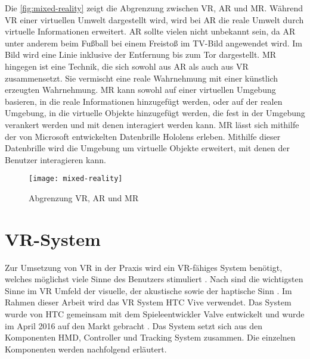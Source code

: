 Die \autoref{fig:mixed-reality} zeigt die Abgrenzung zwischen \ac{VR}, \ac{AR} und \ac{MR}. Während \ac{VR} einer virtuellen Umwelt dargestellt wird, wird bei \ac{AR} die reale Umwelt durch virtuelle Informationen erweitert. \ac{AR} sollte vielen nicht unbekannt sein, da \ac{AR} unter anderem beim Fußball bei einem Freistoß im TV-Bild angewendet wird. Im Bild wird eine Linie inklusive der Entfernung bis zum Tor dargestellt. \ac{MR} hingegen ist eine Technik, die sich sowohl aus \ac{AR} als auch aus \ac{VR} zusammensetzt. Sie vermischt eine reale Wahrnehmung mit einer künstlich erzeugten Wahrnehmung. \ac{MR} kann sowohl auf einer virtuellen Umgebung basieren, in die reale Informationen hinzugefügt werden, oder auf der realen Umgebung, in die virtuelle Objekte hinzugefügt werden, die fest in der Umgebung verankert werden und mit denen interagiert werden kann. \ac{MR} lässt sich mithilfe der von Microsoft entwickelten Datenbrille Hololens erleben. Mithilfe dieser Datenbrille wird die Umgebung um virtuelle Objekte erweitert, mit denen der Benutzer interagieren kann.

\begin{figure}[!htbp]
	\centering
	\texttt{[image: mixed-reality]}
	\caption[Abgrenzung VR, AR und MR]{Abgrenzung VR, AR und MR \cite[S. 20]{BurofurTechnikfolgenAbschatzungbeimDeutschenBundestag.2019}}
	\label{fig:mixed-reality}
\end{figure}

\section{\acs{VR}-System}
Zur Umsetzung von \ac{VR} in der Praxis wird ein \ac{VR}-fähiges System benötigt, welches möglichst viele Sinne des Benutzers stimuliert \cite{Doerner2019}. Nach \citeauthor{DoernerWahrnehmung} sind die wichtigsten Sinne im \ac{VR} Umfeld der visuelle, der akustische sowie der haptische Sinn \cite{DoernerWahrnehmung}. Im Rahmen dieser Arbeit wird das \acs{VR} System HTC Vive verwendet. Das System wurde von HTC gemeinsam mit dem Spieleentwickler Valve entwickelt und wurde im April 2016 auf den Markt gebracht \cite{Fehrenbach.14.4.2016}. Das System setzt sich aus den Komponenten \ac{HMD}, Controller und Tracking System zusammen. Die einzelnen Komponenten werden nachfolgend erläutert. 

